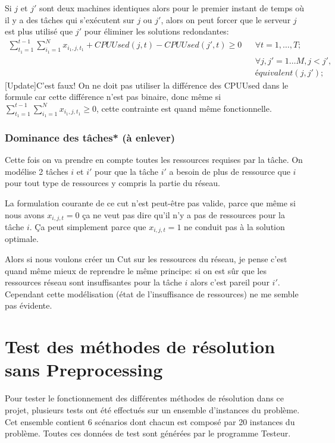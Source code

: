 \documentclass[twoside,fleqn]{EPURapport}
\begin{document}
Si $j$ et $j'$ sont deux machines identiques alors pour le premier instant de temps où il y a des tâches qui s'exécutent sur $j$ ou $j'$, alors on peut forcer que le serveur $j$ est plus utilisé que $j'$ pour éliminer les solutions redondantes:
\begin{align}
\sum_{t_1=1}^{t-1}\sum_{i_1=1}^{N}x_{i_1,j,t_1}+ CPUUsed(j,t)-CPUUsed(j',t) \geq 0
 && \forall t=1,\ldots,T;   \nonumber \\
 && \forall j,j'=1\ldots M, j<j', \nonumber \\
 && équivalent(j,j');
\end{align}
[Update]C'est faux! On ne doit pas utiliser la différence des CPUUsed dans le formule car cette différence n'est pas binaire, donc même si $\sum_{t_1=1}^{t-1}\sum_{i_1=1}^{N}x_{i_1,j,t_1} \geq 0$, cette contrainte est quand même fonctionnelle.

\subsection{Dominance des tâches* (à enlever)}
Cette fois on va prendre en compte toutes les ressources requises par la tâche. On modélise 2 tâches $i$ et $i\prime$ pour que la tâche $i\prime$ a besoin de plus de ressource que $i$ pour tout type de ressources y compris la partie du réseau.

La formulation courante de ce cut n'est peut-être pas valide, parce que même si nous avons $x_{i,j,t}=0$ ça ne veut pas dire qu'il n'y a pas de ressources pour la tâche $i$. Ça peut simplement parce que $x_{i,j,t}=1$ ne conduit pas à la solution optimale.

Alors si nous voulons créer un Cut sur les ressources du réseau, je pense c'est quand même mieux de reprendre le même principe: si on est sûr que les ressources réseau sont insuffisantes pour la tâche $i$ alors c'est pareil pour $i\prime$. Cependant cette modélisation (état de l'insuffisance de ressources) ne me semble pas évidente.

\chapter{Test des méthodes de résolution sans Preprocessing}
Pour tester le fonctionnement des différentes méthodes de résolution dans ce projet, plusieurs tests ont été effectués sur un ensemble d'instances du problème. Cet ensemble contient 6 scénarios dont chacun est composé par 20 instances du problème. Toutes ces données de test sont générées par le programme Testeur.
\end{document}
